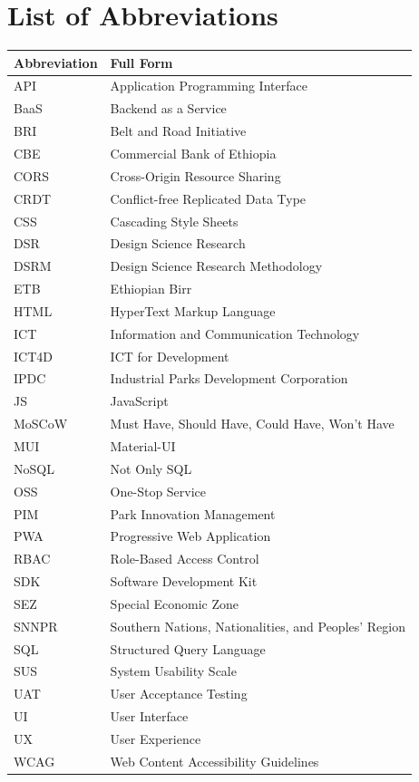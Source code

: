 \chapter*{List of Abbreviations}

\vspace{-0.5em}
{\small
\begin{tabular}{@{}ll@{}}
\toprule
\textbf{Abbreviation} & \textbf{Full Form} \\
\midrule
API & Application Programming Interface \\
BaaS & Backend as a Service \\
BRI & Belt and Road Initiative \\
CBE & Commercial Bank of Ethiopia \\
CORS & Cross-Origin Resource Sharing \\
CRDT & Conflict-free Replicated Data Type \\
CSS & Cascading Style Sheets \\
DSR & Design Science Research \\
DSRM & Design Science Research Methodology \\
ETB & Ethiopian Birr \\
HTML & HyperText Markup Language \\
ICT & Information and Communication Technology \\
ICT4D & ICT for Development \\
IPDC & Industrial Parks Development Corporation \\
JS & JavaScript \\
MoSCoW & Must Have, Should Have, Could Have, Won't Have \\
MUI & Material-UI \\
NoSQL & Not Only SQL \\
OSS & One-Stop Service \\
PIM & Park Innovation Management \\
PWA & Progressive Web Application \\
RBAC & Role-Based Access Control \\
SDK & Software Development Kit \\
SEZ & Special Economic Zone \\
SNNPR & Southern Nations, Nationalities, and Peoples' Region \\
SQL & Structured Query Language \\
SUS & System Usability Scale \\
UAT & User Acceptance Testing \\
UI & User Interface \\
UX & User Experience \\
WCAG & Web Content Accessibility Guidelines \\
\bottomrule
\end{tabular}}
